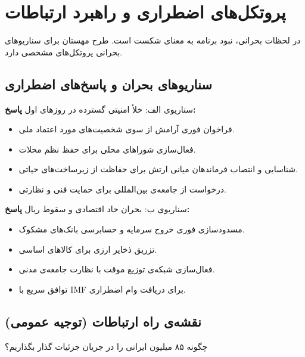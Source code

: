 \chapter{پروتکل‌های اضطراری و راهبرد ارتباطات}
\label{app:emergency}

در لحظات بحرانی، نبود برنامه به معنای شکست است. طرح مهستان برای سناریوهای بحرانی پروتکل‌های مشخصی دارد.

\section{سناریوهای بحران و پاسخ‌های اضطراری}

\begin{modernbox}{سناریوی الف: خلأ امنیتی گسترده در روزهای اول}
\textbf{پاسخ:}
\begin{itemize}
    \item فراخوان فوری آرامش از سوی شخصیت‌های مورد اعتماد ملی.
    \item فعال‌سازی شوراهای محلی برای حفظ نظم محلات.
    \item شناسایی و انتصاب فرماندهان میانی ارتش برای حفاظت از زیرساخت‌های حیاتی.
    \item درخواست از جامعه‌ی بین‌المللی برای حمایت فنی و نظارتی.
\end{itemize}
\end{modernbox}

\begin{modernbox}{سناریوی ب: بحران حاد اقتصادی و سقوط ریال}
\textbf{پاسخ:}
\begin{itemize}
    \item مسدودسازی فوری خروج سرمایه و حسابرسی بانک‌های مشکوک.
    \item تزریق ذخایر ارزی برای کالاهای اساسی.
    \item فعال‌سازی شبکه‌ی توزیع موقت با نظارت جامعه‌ی مدنی.
    \item توافق سریع با IMF برای دریافت وام اضطراری.
\end{itemize}
\end{modernbox}

\section{نقشه‌ی راه ارتباطات (توجیه عمومی)}

چگونه ۸۵ میلیون ایرانی را در جریان جزئیات گذار بگذاریم؟


